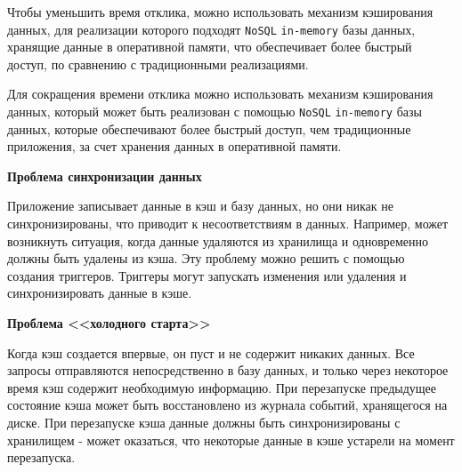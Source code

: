 Чтобы уменьшить время отклика, можно использовать механизм кэширования данных, для реализации которого подходят \texttt{NoSQL} \cite{nosql} \texttt{in-memory} базы данных, хранящие данные в оперативной памяти, что обеспечивает более быстрый доступ, по сравнению с традиционными реализациями.

Для сокращения времени отклика можно использовать механизм кэширования данных, который может быть реализован с помощью \texttt{NoSQL} \cite{nosql} \texttt{in-memory} базы данных, которые обеспечивают более быстрый доступ, чем традиционные приложения, за счет хранения данных в оперативной памяти.

\noindent\textbf{Проблема синхронизации данных}

Приложение записывает данные в кэш и базу данных, но они никак не синхронизированы, что приводит к несоответствиям в данных. Например, может возникнуть ситуация, когда данные удаляются из хранилища и одновременно должны быть удалены из кэша. Эту проблему можно решить с помощью создания триггеров. Триггеры могут запускать изменения или удаления и синхронизировать данные в кэше.

\noindent\textbf{Проблема <<холодного старта>>}

Когда кэш создается впервые, он пуст и не содержит никаких данных. Все запросы отправляются непосредственно в базу данных, и только через некоторое время кэш содержит необходимую информацию. При перезапуске предыдущее состояние кэша может быть восстановлено из журнала событий, хранящегося на диске. При перезапуске кэша данные должны быть синхронизированы с хранилищем - может оказаться, что некоторые данные в кэше устарели на момент перезапуска.


